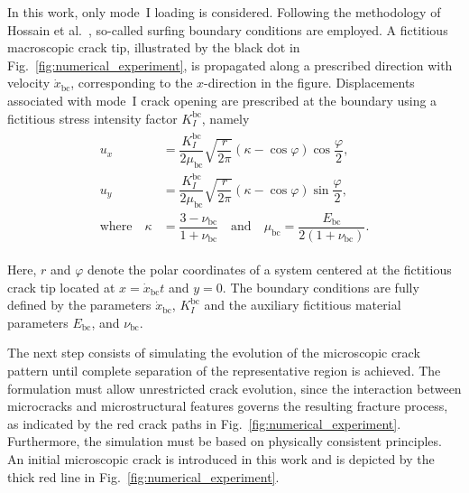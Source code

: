 \documentclass[pdflatex,sn-mathphys-num]{sn-jnl}%
\theoremstyle{thmstyleone}%
\theoremstyle{thmstyletwo}%
\theoremstyle{thmstylethree}%
\begin{document}
In this work, only mode~I loading is considered.
Following the methodology of Hossain et al.~\cite{hossain_effective_2014}, so-called surfing boundary conditions are employed.
A fictitious macroscopic crack tip, illustrated by the black dot in Fig.~\ref{fig:numerical_experiment}, is propagated along a prescribed direction with velocity $\dot{x}_{\text{bc}}$, 
corresponding to the $x$-direction in the figure.
Displacements associated with mode~I crack opening are prescribed at the boundary \added{$\partial\Omega$} using a fictitious 
stress intensity factor $K_I^{\text{bc}}$, namely
\begin{align}
    \begin{split}
        u_x &= \dfrac{K_I^{\text{bc}}}{2\mu_{\text{bc}}}  \sqrt{\dfrac{r}{2\pi}}\left(\kappa - \cos{\varphi}\right)\cos{\dfrac{\varphi}{2}},\\
        u_y &= \dfrac{K_I^{\text{bc}}}{2\mu_{\text{bc}}}  \sqrt{\dfrac{r}{2\pi}}\left(\kappa - \cos{\varphi}\right)\sin{\dfrac{\varphi}{2}},\\
        \text{where} \quad \kappa &= \dfrac{3 - \nu_{\text{bc}}}{1 + \nu_{\text{bc}}} \quad \text{and} \quad \mu_{\text{bc}} = \dfrac{E_{\text{bc}}}{2\left(1 + \nu_{\text{bc}}\right)}.
        \label{eq:surfing-bcs}
    \end{split}
\end{align}

Here, $r$ and $\varphi$ denote the polar coordinates of a system centered at the fictitious 
crack tip located at $x = \dot{x}_{\text{bc}} t$ and $y = 0$.
The boundary conditions are fully defined by the 
parameters $\dot{x}_{\text{bc}}$, $K_I^{\text{bc}}$ and the auxiliary fictitious material parameters  
$E_{\text{bc}}$, and $\nu_{\text{bc}}$.

The next step consists of simulating the evolution of the microscopic crack pattern until complete separation of the representative region is achieved.
The formulation must allow unrestricted crack evolution, since the interaction between microcracks and microstructural features governs the resulting fracture process, as indicated by the red crack paths in Fig.~\ref{fig:numerical_experiment}.
Furthermore, the simulation must be based on physically consistent principles.
An initial microscopic crack is introduced in this work and is depicted by the thick red line in Fig.~\ref{fig:numerical_experiment}.
\end{document}

